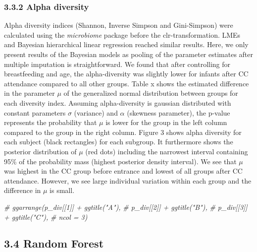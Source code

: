 \documentclass[]{article}
\newenvironment{Shaded}{\begin{snugshade}}{\end{snugshade}}
\newcommand{\CommentTok}[1]{\textcolor[rgb]{0.56,0.35,0.01}{\textit{#1}}}
\begin{document}
\subsubsection{3.3.2 Alpha diversity}\label{alpha-diversity}

Alpha diversity indices (Shannon, Inverse Simpson and Gini-Simpson) were
calculated using the \emph{microbiome} package before the
clr-transformation. LMEs and Bayesian hierarchical linear regression
reached similar results. Here, we only present results of the Bayesian
models as pooling of the parameter estimates after multiple imputation
is straightforward. We found that after controlling for breastfeeding
and age, the alpha-diversity was slightly lower for infants after CC
attendance compared to all other groups. Table x shows the estimated
difference in the parameter \(\mu\) of the generalized normal
distribution between groups for each diversity index. Assuming
alpha-diversity is gaussian distributed with constant parameters
\(\sigma\) (variance) and \(\alpha\) (skewness parameter), the p-value
represents the probability that \(\mu\) is lower for the group in the
left column compared to the group in the right column. Figure 3 shows
alpha diversity for each subject (black rectangles) for each subgroup.
It furthermore shows the posterior distribution of \(\mu\) (red dots)
including the narrowest interval containing 95\% of the probability mass
(highest posterior density interval). We see that \(\mu\) was highest in
the CC group before entrance and lowest of all groups after CC
attendance. However, we see large individual variation within each group
and the difference in \(\mu\) is small.

\begin{Shaded}
\begin{Highlighting}[]
\CommentTok{# ggarrange(p_div[[1]] + ggtitle("A"), }
\CommentTok{#           p_div[[2]] + ggtitle("B"), }
\CommentTok{#           p_div[[3]] + ggtitle("C"),}
\CommentTok{#           ncol = 3)}
\end{Highlighting}
\end{Shaded}

\subsection{3.4 Random Forest}\label{random-forest}
\end{document}
